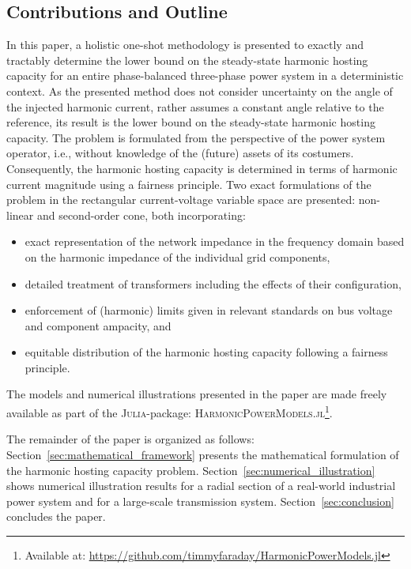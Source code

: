 \subsection{Contributions and Outline}
\label{sec:contribution_and_outline}

In this paper, a holistic one-shot methodology is presented to exactly and tractably determine the lower bound on the steady-state harmonic hosting capacity for an entire phase-balanced three-phase power system in a deterministic context. As the presented method does not consider uncertainty on the angle of the injected harmonic current, rather assumes a constant angle relative to the reference, its result is the lower bound on the steady-state harmonic hosting capacity. The problem is formulated from the perspective of the power system operator, i.e., without knowledge of the (future) assets of its costumers. Consequently, the harmonic hosting capacity is determined in terms of harmonic current magnitude using a fairness principle. Two exact formulations of the problem in the rectangular current-voltage variable space are presented: non-linear and second-order cone, both incorporating: 
\begin{itemize}
    \item exact representation of the network impedance in the frequency domain based on the harmonic impedance of the individual grid components,
    \item detailed treatment of transformers including the effects of their configuration,
    \item enforcement of (harmonic) limits given in relevant standards on bus voltage and component ampacity, and
    \item equitable distribution of the harmonic hosting capacity following a fairness principle. 
\end{itemize}
The models and numerical illustrations presented in the paper are made freely available as part of the \textsc{Julia}-package: \textsc{HarmonicPowerModels.jl}\footnote{Available at: \href{https://github.com/timmyfaraday/HarmonicPowerModels.jl}{https://github.com/timmyfaraday/HarmonicPowerModels.jl}}.

The remainder of the paper is organized as follows: Section~\ref{sec:mathematical_framework} presents the mathematical formulation of the harmonic hosting capacity problem. Section~\ref{sec:numerical_illustration} shows numerical illustration results for a radial section of a real-world industrial power system and for a large-scale transmission system. Section~\ref{sec:conclusion} concludes the paper.